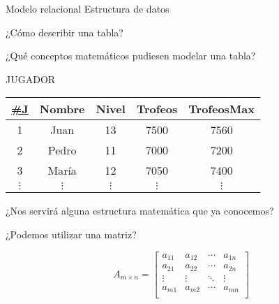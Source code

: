 \begin{frame}{Modelo relacional}
    \centering
    \Huge \textcolor{blue3}{Estructura de datos}

\end{frame}

\begin{frame}{¿C\'omo describir una tabla?}
    \begin{LARGE}
        
        ¿Qu\'e conceptos matem\'aticos pudiesen modelar una tabla?
    \end{LARGE}
    


    \begin{center}
        JUGADOR
        \vspace{2mm}

        \begin{tabular}{|c|c|c|c|c|}
            \hline
            \underline{\#J} & Nombre & Nivel& Trofeos & TrofeosMax\\
            \hline
            1 & Juan & 13 & 7500 & 7560\\
            \hline
            2 & Pedro &  11 & 7000 & 7200 \\
            \hline
            3 & Mar\'ia & 12  & 7050 & 7400\\
            \hline
            $\vdots$ & $\vdots$ & $\vdots$ & $\vdots$ & $\vdots$\\
            \hline
            
        \end{tabular}
    \end{center}
   
\end{frame}

\begin{frame}{¿Nos servir\'a alguna estructura matem\'atica que ya conocemos?}
    \centering
    \begin{LARGE}
        
        ¿Podemos utilizar una matriz?
    \end{LARGE}
    
    \vspace{5mm}

    \[
  A_{m\times n} =
  \left[ {\begin{array}{cccc}
    a_{11} & a_{12} & \cdots & a_{1n}\\
    a_{21} & a_{22} & \cdots & a_{2n}\\
    \vdots & \vdots & \ddots & \vdots\\
    a_{m1} & a_{m2} & \cdots & a_{mn}\\
  \end{array} } \right]
\]

\vspace{5mm}




\end{frame}

